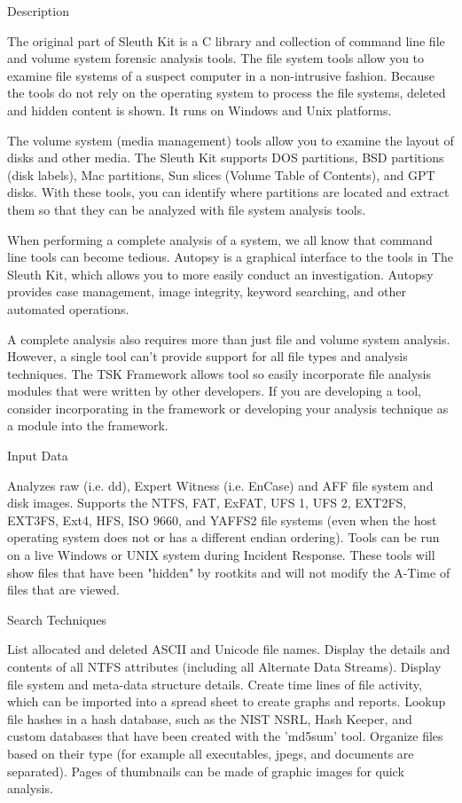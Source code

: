 Description

The original part of Sleuth Kit is a C library and collection of command line
file and volume system forensic analysis tools. The file system tools allow you
to examine file systems of a suspect computer in a non-intrusive fashion. Because
the tools do not rely on the operating system to process the file systems, deleted
and hidden content is shown. It runs on Windows and Unix platforms.

The volume system (media management) tools allow you to examine the layout of disks
and other media. The Sleuth Kit supports DOS partitions, BSD partitions 
(disk labels), Mac partitions, Sun slices (Volume Table of Contents), and 
GPT disks. With these tools, you can identify where partitions are located 
and extract them so that they can be analyzed with file system analysis tools.

When performing a complete analysis of a system, we all know that command line 
tools can become tedious. Autopsy is a graphical interface to the tools in The 
Sleuth Kit, which allows you to more easily conduct an investigation. Autopsy 
provides case management, image integrity, keyword searching, and other automated
operations.

A complete analysis also requires more than just file and volume system analysis.
However, a single tool can't provide support for all file types and analysis 
techniques. The TSK Framework allows tool so easily incorporate file analysis
modules that were written by other developers. If you are developing a tool,
consider incorporating in the framework or developing your analysis technique
as a module into the framework.

Input Data

Analyzes raw (i.e. dd), Expert Witness (i.e. EnCase) and AFF file system and disk
images.
Supports the NTFS, FAT, ExFAT, UFS 1, UFS 2, EXT2FS, EXT3FS, Ext4, HFS, ISO 9660,
and YAFFS2 file systems (even when the host operating system does not or has a
different endian ordering).
Tools can be run on a live Windows or UNIX system during Incident Response. 
These tools will show files that have been "hidden" by rootkits and will not 
modify the A-Time of files that are viewed.

Search Techniques

List allocated and deleted ASCII and Unicode file names.
Display the details and contents of all NTFS attributes (including all Alternate
Data Streams).
Display file system and meta-data structure details.
Create time lines of file activity, which can be imported into a spread sheet to 
create graphs and reports.
Lookup file hashes in a hash database, such as the NIST NSRL, Hash Keeper, and 
custom databases that have been created with the 'md5sum' tool.
Organize files based on their type (for example all executables, jpegs, and
documents are separated). Pages of thumbnails can be made of graphic images 
for quick analysis.

